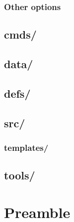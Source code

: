         \subsubsection{Other options}
        \label{sec:tutorial/architecture/root/other}
        
    
    \subsection{cmds/}
    \label{sec:tutorial/architecture/cmds}
    
    
    \subsection{data/}
    \label{sec:tutorial/architecture/data}
    
    
    \subsection{defs/}
    \label{sec:tutorial/architecture/defs}
    
    
    \subsection{src/}
    \label{sec:tutorial/architecture/src}
    
    
        \subsubsection{templates/}
        \label{sec:tutorial/architecture/src/template}
        
    
    \subsection{tools/}
    \label{sec:tutorial/architecture/tools}
    
    
\newpage
\section{Preamble}
\label{sec:tutorial/preamble}


